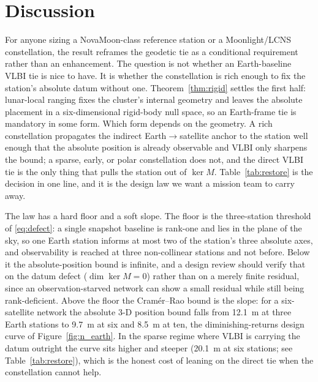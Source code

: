 \section{Discussion}
\label{sec:discussion}

For anyone sizing a NovaMoon-class reference station or a Moonlight/LCNS
constellation, the result reframes the geodetic tie as a conditional requirement
rather than an enhancement. The question is not whether an Earth-baseline VLBI
tie is nice to have. It is whether the constellation is rich enough to fix the
station's absolute datum without one. Theorem~\ref{thm:rigid} settles the first
half: lunar-local ranging fixes the cluster's internal geometry and leaves the
absolute placement in a six-dimensional rigid-body null space, so an Earth-frame
tie is mandatory in some form. Which form depends on the geometry. A rich
constellation propagates the indirect Earth$\to$satellite anchor to the station
well enough that the absolute position is already observable and VLBI only
sharpens the bound; a sparse, early, or polar constellation does not, and the
direct VLBI tie is the only thing that pulls the station out of $\ker M$.
Table~\ref{tab:restore} is the decision in one line, and it is the design law we
want a mission team to carry away.

The law has a hard floor and a soft slope. The floor is the three-station
threshold of \eqref{eq:defect}: a single snapshot baseline is rank-one and lies
in the plane of the sky, so one Earth station informs at most two of the
station's three absolute axes, and observability is reached at three non-collinear
stations and not before. Below it the absolute-position bound is infinite, and a
design review should verify that on the datum defect ($\dim\ker M = 0$) rather
than on a merely finite residual, since an observation-starved network can show a
small residual while still being rank-deficient. Above the floor the
Cram\'er--Rao bound is the slope: for a six-satellite network the absolute 3-D
position bound falls from \SI{12.1}{\meter} at three Earth stations to
\SI{9.7}{\meter} at six and \SI{8.5}{\meter} at ten, the diminishing-returns
design curve of Figure~\ref{fig:n_earth}. In the sparse regime where VLBI is
carrying the datum outright the curve sits higher and steeper (\SI{20.1}{\meter}
at six stations; see Table~\ref{tab:restore}), which is the honest cost of leaning
on the direct tie when the constellation cannot help.

